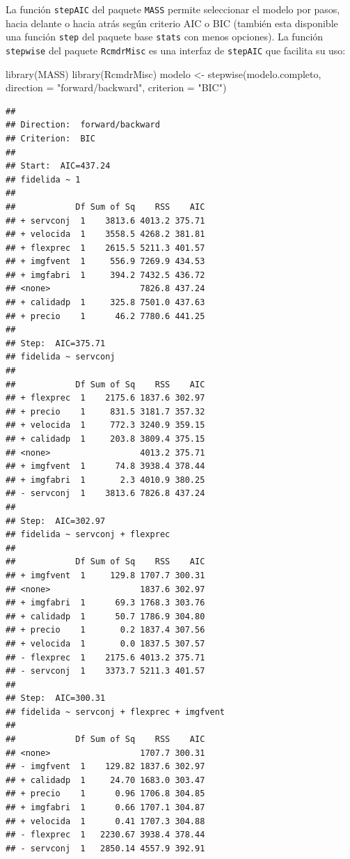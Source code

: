 \documentclass[
]{book}
\newenvironment{Shaded}{\begin{snugshade}}{\end{snugshade}}
\newcommand{\AttributeTok}[1]{\textcolor[rgb]{0.77,0.63,0.00}{#1}}
\newcommand{\FunctionTok}[1]{\textcolor[rgb]{0.00,0.00,0.00}{#1}}
\newcommand{\NormalTok}[1]{#1}
\newcommand{\OtherTok}[1]{\textcolor[rgb]{0.56,0.35,0.01}{#1}}
\newcommand{\StringTok}[1]{\textcolor[rgb]{0.31,0.60,0.02}{#1}}
\theoremstyle{break}
\theoremstyle{nonumberplain}
\begin{document}
La función \texttt{stepAIC} del paquete \texttt{MASS} permite seleccionar el modelo por pasos,
hacia delante o hacia atrás según criterio AIC o BIC (también esta disponible una función \texttt{step} del paquete base \texttt{stats} con menos opciones).
La función \texttt{stepwise} del paquete \texttt{RcmdrMisc} es una interfaz de \texttt{stepAIC}
que facilita su uso:

\begin{Shaded}
\begin{Highlighting}[]
\FunctionTok{library}\NormalTok{(MASS)}
\FunctionTok{library}\NormalTok{(RcmdrMisc)}
\NormalTok{modelo }\OtherTok{\textless{}{-}} \FunctionTok{stepwise}\NormalTok{(modelo.completo, }\AttributeTok{direction =} \StringTok{"forward/backward"}\NormalTok{, }\AttributeTok{criterion =} \StringTok{"BIC"}\NormalTok{)}
\end{Highlighting}
\end{Shaded}

\begin{verbatim}
## 
## Direction:  forward/backward
## Criterion:  BIC 
## 
## Start:  AIC=437.24
## fidelida ~ 1
## 
##            Df Sum of Sq    RSS    AIC
## + servconj  1    3813.6 4013.2 375.71
## + velocida  1    3558.5 4268.2 381.81
## + flexprec  1    2615.5 5211.3 401.57
## + imgfvent  1     556.9 7269.9 434.53
## + imgfabri  1     394.2 7432.5 436.72
## <none>                  7826.8 437.24
## + calidadp  1     325.8 7501.0 437.63
## + precio    1      46.2 7780.6 441.25
## 
## Step:  AIC=375.71
## fidelida ~ servconj
## 
##            Df Sum of Sq    RSS    AIC
## + flexprec  1    2175.6 1837.6 302.97
## + precio    1     831.5 3181.7 357.32
## + velocida  1     772.3 3240.9 359.15
## + calidadp  1     203.8 3809.4 375.15
## <none>                  4013.2 375.71
## + imgfvent  1      74.8 3938.4 378.44
## + imgfabri  1       2.3 4010.9 380.25
## - servconj  1    3813.6 7826.8 437.24
## 
## Step:  AIC=302.97
## fidelida ~ servconj + flexprec
## 
##            Df Sum of Sq    RSS    AIC
## + imgfvent  1     129.8 1707.7 300.31
## <none>                  1837.6 302.97
## + imgfabri  1      69.3 1768.3 303.76
## + calidadp  1      50.7 1786.9 304.80
## + precio    1       0.2 1837.4 307.56
## + velocida  1       0.0 1837.5 307.57
## - flexprec  1    2175.6 4013.2 375.71
## - servconj  1    3373.7 5211.3 401.57
## 
## Step:  AIC=300.31
## fidelida ~ servconj + flexprec + imgfvent
## 
##            Df Sum of Sq    RSS    AIC
## <none>                  1707.7 300.31
## - imgfvent  1    129.82 1837.6 302.97
## + calidadp  1     24.70 1683.0 303.47
## + precio    1      0.96 1706.8 304.85
## + imgfabri  1      0.66 1707.1 304.87
## + velocida  1      0.41 1707.3 304.88
## - flexprec  1   2230.67 3938.4 378.44
## - servconj  1   2850.14 4557.9 392.91
\end{verbatim}
\end{document}
